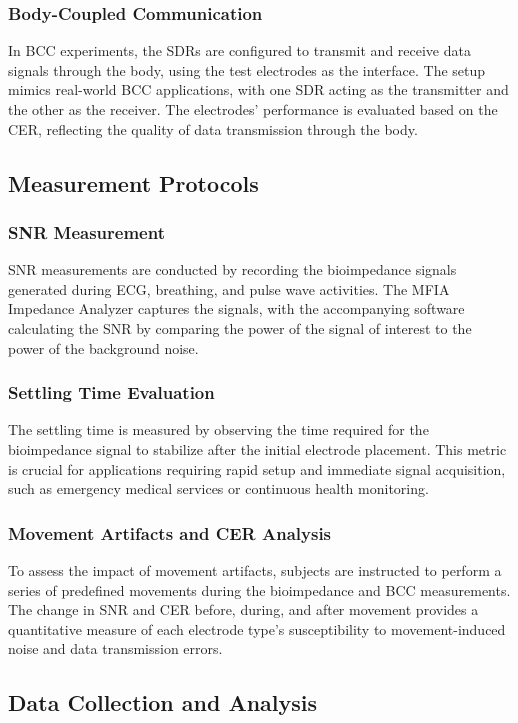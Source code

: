 \documentclass[conference]{IEEEtran}
\begin{document}
\subsubsection{Body-Coupled Communication}
In BCC experiments, the SDRs are configured to transmit and receive data signals through the body, using the test electrodes as the interface. The setup mimics real-world BCC applications, with one SDR acting as the transmitter and the other as the receiver. The electrodes' performance is evaluated based on the CER, reflecting the quality of data transmission through the body.

\subsection{Measurement Protocols}

\subsubsection{SNR Measurement}
SNR measurements are conducted by recording the bioimpedance signals generated during ECG, breathing, and pulse wave activities. The MFIA Impedance Analyzer captures the signals, with the accompanying software calculating the SNR by comparing the power of the signal of interest to the power of the background noise.

\subsubsection{Settling Time Evaluation}
The settling time is measured by observing the time required for the bioimpedance signal to stabilize after the initial electrode placement. This metric is crucial for applications requiring rapid setup and immediate signal acquisition, such as emergency medical services or continuous health monitoring.

\subsubsection{Movement Artifacts and CER Analysis}
To assess the impact of movement artifacts, subjects are instructed to perform a series of predefined movements during the bioimpedance and BCC measurements. The change in SNR and CER before, during, and after movement provides a quantitative measure of each electrode type's susceptibility to movement-induced noise and data transmission errors.

\subsection{Data Collection and Analysis}
\end{document}
